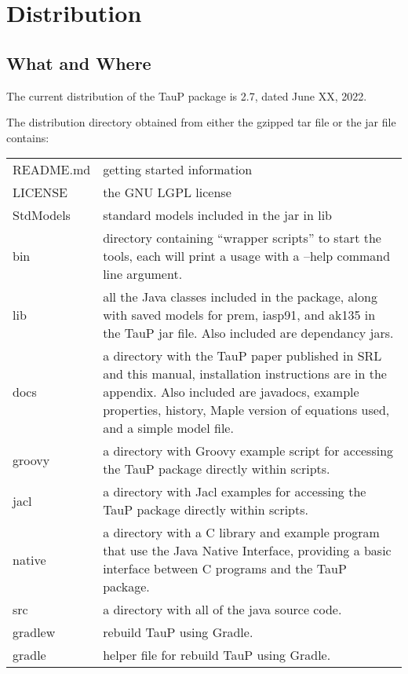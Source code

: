 
\section{Distribution}


\subsection{What and Where}
The current distribution of the TauP package is 2.7, dated June XX, 2022.

The distribution directory obtained from either the gzipped tar file or the jar file contains:

\begin{center}
\begin{tabular}{lp{4in}}
README.md & getting started information \\
LICENSE & the GNU LGPL license \\
StdModels & standard models included in the jar in lib \\
bin & directory containing ``wrapper scripts'' to start the tools,
   each will print a usage with a --help command line argument. \\
lib & all the Java classes included in the package, along with
               saved models for prem, iasp91, and ak135 in the TauP jar file.
               Also included are dependancy jars. \\
docs & a directory with the TauP paper published in SRL and this manual,
installation instructions are in the appendix. Also included are javadocs,
example properties, history, Maple version of equations used, and a simple model file.\\
groovy & a directory with Groovy example script for accessing the TauP package directly within scripts. \\
jacl & a directory with Jacl examples for accessing the TauP package directly within scripts. \\
native & a directory with a C library and example program that use the
Java Native Interface, providing a basic interface between C programs
and the TauP package. \\
src & a directory with all of the java source code. \\
gradlew & rebuild TauP using Gradle. \\
gradle & helper file for rebuild TauP using Gradle. \\
\end{tabular}
\end{center}

